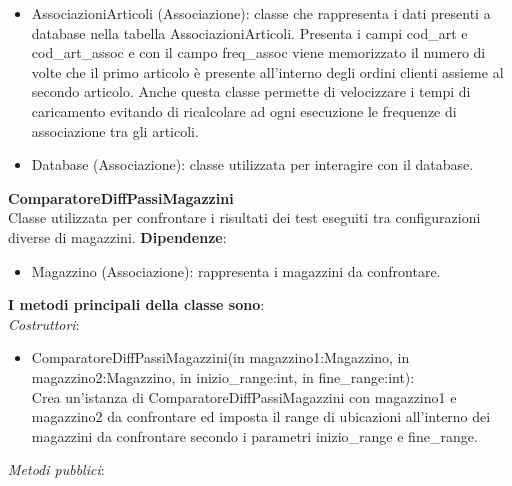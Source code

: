 \begin{itemize}
    \item AssociazioniArticoli (Associazione): classe che rappresenta i dati presenti a database nella tabella AssociazioniArticoli.
    Presenta i campi cod\_art e cod\_art\_assoc e con il campo freq\_assoc viene memorizzato il numero di volte che il primo articolo è
    presente all'interno degli ordini clienti assieme al secondo articolo.
    Anche questa classe permette di velocizzare i tempi di caricamento evitando di ricalcolare ad ogni esecuzione le frequenze di associazione
    tra gli articoli.\\
    \item Database (Associazione): classe utilizzata per interagire con il database.\\
\end{itemize}

\textbf{ComparatoreDiffPassiMagazzini}\\
Classe utilizzata per confrontare i risultati dei test eseguiti tra configurazioni diverse di magazzini.
\textbf{Dipendenze}:
\begin{itemize}
    \item Magazzino (Associazione): rappresenta i magazzini da confrontare.\\
\end{itemize}
\textbf{I metodi principali della classe sono}:\\
\textit{Costruttori}:\\
\begin{itemize}
    \item ComparatoreDiffPassiMagazzini(in magazzino1:Magazzino, in magazzino2:Magazzino, in inizio\_range:int, in fine\_range:int):\\
    Crea un'istanza di ComparatoreDiffPassiMagazzini con magazzino1 e magazzino2 da confrontare ed imposta il range di ubicazioni all'interno dei magazzini da confrontare secondo i parametri inizio\_range e fine\_range.\\ 
\end{itemize}
\textit{Metodi pubblici}:\\
